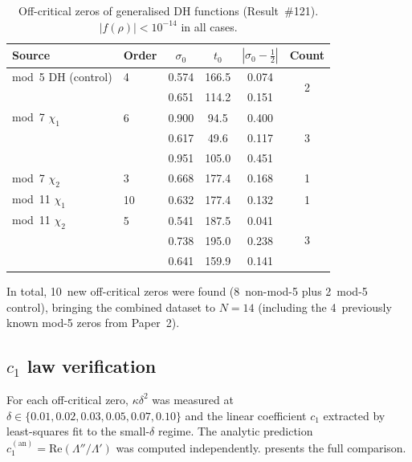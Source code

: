 \documentclass[11pt, a4paper]{article}
\theoremstyle{plain}
\theoremstyle{definition}
\newcommand{\abs}[1]{\left|#1\right|}
\newcommand{\Lam}{\Lambda}             %
\newcommand{\kap}{\kappa}             %
\begin{document}
\begin{table}[ht]
\centering
\caption{Off-critical zeros of generalised DH functions (Result~\#121).
  $\abs{f(\rho)} < 10^{-14}$ in all cases.}
\label{tab:dh-zeros}
\begin{tabular}{@{}llcccc@{}}
\toprule
\textbf{Source} & \textbf{Order} & $\sigma_{0}$ & $t_{0}$ &
  $\abs{\sigma_{0}-\tfrac{1}{2}}$ & \textbf{Count} \\
\midrule
mod~5 DH (control) & 4 & 0.574 & 166.5 & 0.074 & \multirow{2}{*}{2} \\
                    &   & 0.651 & 114.2 & 0.151 & \\
\midrule
mod~7 $\chi_{1}$ & 6 & 0.900 & 94.5 & 0.400 & \multirow{3}{*}{3} \\
                 &   & 0.617 & 49.6 & 0.117 & \\
                 &   & 0.951 & 105.0 & 0.451 & \\
\midrule
mod~7 $\chi_{2}$ & 3 & 0.668 & 177.4 & 0.168 & 1 \\
\midrule
mod~11 $\chi_{1}$ & 10 & 0.632 & 177.4 & 0.132 & 1 \\
\midrule
mod~11 $\chi_{2}$ & 5 & 0.541 & 187.5 & 0.041 & \multirow{3}{*}{3} \\
                  &   & 0.738 & 195.0 & 0.238 & \\
                  &   & 0.641 & 159.9 & 0.141 & \\
\bottomrule
\end{tabular}
\end{table}

In total, 10~new off-critical zeros were found (8~non-mod-5 plus
2~mod-5 control), bringing the combined dataset to $N=14$ (including
the 4~previously known mod-5 zeros from Paper~2).


\subsection{$c_{1}$ law verification}
\label{sec:c1-verify}

For each off-critical zero, $\kap\delta^{2}$ was measured at
$\delta \in \{0.01, 0.02, 0.03, 0.05, 0.07, 0.10\}$ and the linear
coefficient $c_{1}$ extracted by least-squares fit to the small-$\delta$
regime.  The analytic prediction $c_{1}^{(\mathrm{an})} =
\mathrm{Re}(\Lam''/\Lam')$ was computed independently.
 presents the full comparison.
\end{document}
